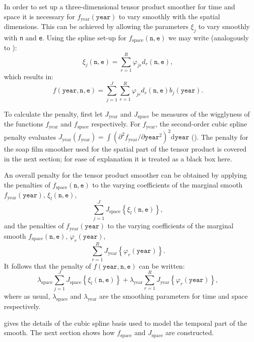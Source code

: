 In order to set up a three-dimensional tensor product smoother for time and space it is necessary for $f_\text{year}(\texttt{year})$ to vary smoothly with the spatial dimensions. This can be achieved by allowing the parameters $\xi_j$ to vary smoothly with \texttt{n} and \texttt{e}. Using the spline set-up for $f_\text{space}(\texttt{n},\texttt{e})$ we may write (analogously to ):
$$
\xi_j(\texttt{n},\texttt{e})=\sum_{r=1}^R \varphi_{jr} d_r(\texttt{n},\texttt{e}),
$$    
which results in:
$$
f(\texttt{year},\texttt{n},\texttt{e})=\sum_{j=1}^J \sum_{r=1}^R \varphi_{jr} d_r(\texttt{n},\texttt{e}) b_j(\texttt{year}). 
$$

To calculate the penalty, first let $J_\text{year}$ and $J_\text{space}$ be measures of the wigglyness of the functions $f_\text{year}$ and $f_\text{space}$ respectively. For $f_\text{year}$, the second-order cubic spline penalty evaluates $J_\text{year}(f_\text{year})=\int\left( \partial^2 f_\text{year}/\partial \texttt{year}^2 \right)^2 \text{d}\texttt{year}$ (). The penalty for the soap film smoother used for the spatial part of the tensor product is covered in the next section; for ease of explanation it is treated as a black box here.

An overall penalty for the tensor product smoother can be obtained by applying the penalties of $f_\text{space}(\texttt{n},\texttt{e})$ to the varying coefficients of the marginal smooth $f_\text{year}(\texttt{year})$, $\xi_l(\texttt{n},\texttt{e})$,
$$
\sum_{j=1}^J J_\text{space}\left\{  \xi_l(\texttt{n},\texttt{e}) \right\},
$$ 
and the penalties of $f_\text{year}(\texttt{year})$ to the varying coefficients of the marginal smooth $f_\text{space}(\texttt{n},\texttt{e})$, $\varphi_r(\texttt{year})$,  
$$
\sum_{r=1}^R J_\text{year}\left\{  \varphi_r(\texttt{year}) \right\}.
$$ 
It follows that the penalty of $f(\texttt{year},\texttt{n},\texttt{e})$ can be written:
\begin{equation}
\lambda_\text{space} \sum_{j=1}^J J_\text{space}\left\{  \xi_l(\texttt{n},\texttt{e}) \right\} + \lambda_\text{year} \sum_{r=1}^R J_\text{year}\left\{  \varphi_r(\texttt{year}) \right\},
\label{it-fullpen}
\end{equation}
where as usual, $\lambda_\text{space}$ and $\lambda_\text{year}$ are the smoothing parameters for time and space respectively.

 gives the details of the cubic spline basis used to model the temporal part of the smooth. The next section shows how $f_\text{space}$ and $J_\text{space}$ are constructed.

